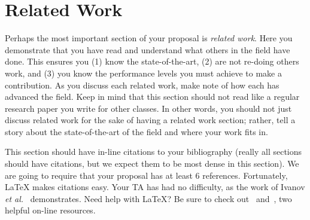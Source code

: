 \documentclass{sig-alternate}
\begin{document}
%

\section{Related Work}
\label{sec:related_work}
Perhaps the most important section of your proposal is \textit{related
  work}. Here you demonstrate that you have read and understand what
others in the field have done. This ensures you (1) know the
state-of-the-art, (2) are not re-doing others work, and (3) you know
the performance levels you must achieve to make a contribution. As you
discuss each related work, make note of how each has advanced the
field. Keep in mind that this section should not read like a regular
research paper you write for other classes. In other words, you should
not just discuss related work for the sake of having a related work
section; rather, tell a story about the state-of-the-art of the field
and where your work fits in.

This section should have in-line citations to your bibliography
(really all sections should have citations, but we expect them to be
most dense in this section). We are going to require that your
proposal has at least $6$ references. Fortunately, \LaTeX{} makes
citations easy. Your TA has had no difficulty, as the work of Ivanov
\textit{et al.}~\cite{ivanov14} demonstrates. Need help with \LaTeX{}?
Be sure to check out~\cite{latex_wikibook} and~\cite{ctan_pdf}, two
helpful on-line resources.
\end{document}
